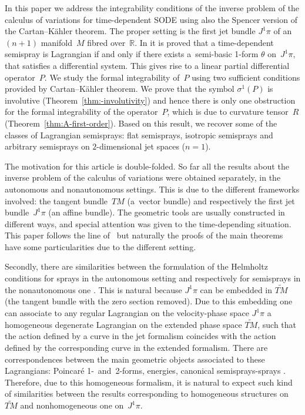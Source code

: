 \documentclass[pdftex]{sigma}
\begin{document}
In this paper we address the integrability conditions of the inverse
problem of the calculus of variations for time-dependent SODE using
also the Spencer version of the Cartan--K\"ahler theorem. The proper
setting is the f\/irst jet bundle $J^{1}\pi$ of an $(n+1)$ manifold~$M$ f\/ibred over~$\mathbb{R}$. In \cite{B-C-2010} it is proved that
a time-dependent semispray is Lagrangian if and only if there exists
a~semi-basic 1-form $\theta$ on~$J^{1}\pi$, that satisf\/ies a dif\/ferential
system. This gives rise to a linear partial dif\/ferential operator~$P$.
We study the formal integrability of~$P$ using two suf\/f\/icient conditions
provided by Cartan--K\"ahler theorem. We prove that the symbol $\sigma^{1}(P)$
is involutive (Theorem~\ref{thm:-involutivity}) and hence there is
only one obstruction for the formal integrability of the ope\-ra\-tor~$P$, which is due to curvature tensor~$R$ (Theorem~\ref{thm:A-first-order}).
Based on this result, we recover some of the classes of Lagrangian
semisprays: f\/lat semisprays, isotropic semisprays and arbitrary semisprays
on $2$-dimensional jet spaces ($n=1$).

The motivation for this article is double-folded. So far all the results
about the inverse problem of the calculus of variations were obtained
separately, in the autonomous and non\-auto\-nomous settings. This is
due to the dif\/ferent frameworks involved: the tangent bundle~$TM$
(a~vector bundle) and respectively the f\/irst jet bundle~$J^{1}\pi$
(an af\/f\/ine bundle). The geometric tools are usually constructed in
dif\/ferent ways, and special attention was given to the time-depending
situation. This paper follows the line of~\cite{B-M_arxiv} but naturally
the proofs of the main theorems have some particularities due to the
dif\/ferent setting.


Secondly, there are similarities between the formulation of the Helmholtz
conditions for sprays in the autonomous setting and respectively for
semisprays in the nonautonomous one \cite{B-C-2010, bucataru09}. This
is natural because $J^{1}\pi$ can be embedded in $\widetilde{TM}$
(the tangent bundle with the zero section removed). Due to this embedding
one can associate to any regular Lagrangian on the velocity-phase
space $J^{1}\pi$ a homogeneous degenerate Lagrangian on the extended
phase space $\widetilde{TM}$, such that the action def\/ined by a curve
in the jet formalism coincides with the action def\/ined by the corresponding
curve in the extended formalism. There are correspondences between
the main geometric objects associated to these Lagrangians: Poincar\'e
1-~and~2-forms, energies, canonical semisprays-sprays
\cite{Ant-B,CantrijnHom86,CarinenaHom2006,Klein}. Therefore,
due to this homogeneous formalism, it is natural to expect such kind
of similarities between the results corresponding to homogeneous structures
on~$\widetilde{TM}$ and nonhomogeneous one on~$J^{1}\pi$.
\end{document}
